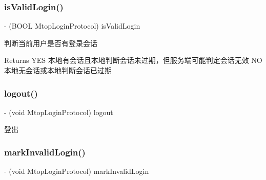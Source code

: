 \subsubsection{\texorpdfstring{is\+Valid\+Login()}{isValidLogin()}}
{\footnotesize\ttfamily -\/ (B\+O\+OL Mtop\+Login\+Protocol) is\+Valid\+Login \begin{DoxyParamCaption}{ }\end{DoxyParamCaption}\hspace{0.3cm}{\ttfamily [required]}}

判断当前用户是否有登录会话 \begin{DoxyReturn}{Returns}
Y\+ES 本地有会话且本地判断会话未过期，但服务端可能判定会话无效 NO 本地无会话或本地判断会话已过期 
\end{DoxyReturn}
\mbox{\label{protocol_mtop_login_protocol_01-p_ac22bf1c113294b7aba4c1f1e92445e4e}} 
\subsubsection{\texorpdfstring{logout()}{logout()}}
{\footnotesize\ttfamily -\/ (void Mtop\+Login\+Protocol) logout \begin{DoxyParamCaption}{ }\end{DoxyParamCaption}\hspace{0.3cm}{\ttfamily [required]}}

登出 \mbox{\label{protocol_mtop_login_protocol_01-p_aa7126056122d52ded68c8fc843799ef3}} 
\subsubsection{\texorpdfstring{mark\+Invalid\+Login()}{markInvalidLogin()}}
{\footnotesize\ttfamily -\/ (void Mtop\+Login\+Protocol) mark\+Invalid\+Login \begin{DoxyParamCaption}{ }\end{DoxyParamCaption}\hspace{0.3cm}{\ttfamily [required]}}

